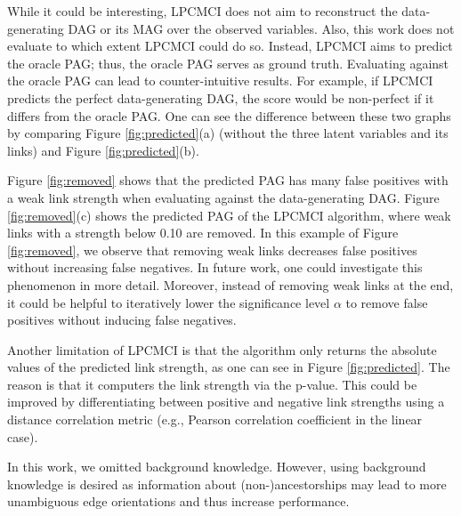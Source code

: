 \documentclass[conference]{IEEEtran}
\begin{document}
While it could be interesting, LPCMCI does not aim to reconstruct the data-generating DAG or its MAG over the observed variables. Also, this work does not evaluate to which extent LPCMCI could do so.
Instead, LPCMCI aims to predict the oracle PAG; thus, the oracle PAG serves as ground truth. Evaluating against the oracle PAG can lead to counter-intuitive results. For example, if LPCMCI predicts the perfect data-generating DAG, the score would be non-perfect if it differs from the oracle PAG. One can see the difference between these two graphs by comparing Figure \ref{fig:predicted}(a) (without the three latent variables and its links) and Figure \ref{fig:predicted}(b).

Figure \ref{fig:removed} shows that the predicted PAG has many false positives with a weak link strength when evaluating against the data-generating DAG. Figure \ref{fig:removed}(c) shows the predicted PAG of the LPCMCI algorithm, where weak links with a strength below 0.10 are removed. In this example of Figure \ref{fig:removed}, we observe that removing weak links decreases false positives without increasing false negatives. In future work, one could investigate this phenomenon in more detail. Moreover, instead of removing weak links at the end, it could be helpful to iteratively lower the significance level $\alpha$ to remove false positives without inducing false negatives.

Another limitation of LPCMCI is that the algorithm only returns the absolute values of the predicted link strength, as one can see in Figure \ref{fig:predicted}. The reason is that it computers the link strength via the p-value. This could be improved by differentiating between positive and negative link strengths using a distance correlation metric (e.g., Pearson correlation coefficient in the linear case).

In this work, we omitted background knowledge. However, using background knowledge is desired as information about (non-)ancestorships may lead to more unambiguous edge orientations and thus increase performance.
\end{document}

